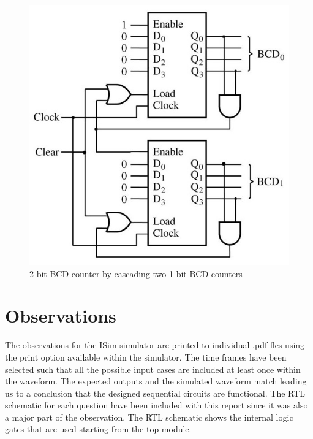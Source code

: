 \documentclass{lab_sheet}
\begin{document}
    \begin{figure}[H]
        \centering
        \includegraphics[scale=2.5]{../Figures/q7.jpg}
        \caption{2-bit BCD counter by cascading two 1-bit BCD counters}
        \label{fig:q7}
    \end{figure}
    \section{Observations}
    The observations for the ISim simulator are printed to individual .pdf fles using the print option available within the simulator. The time frames have been selected such that all the possible input cases are included at least once within the waveform. The expected outputs and the simulated waveform match leading us to a conclusion that the designed sequential circuits are functional. The RTL schematic for each question have been included with this report since it was also a major part of the observation. The RTL schematic shows the internal logic gates that are used starting from the top module.
\end{document}
